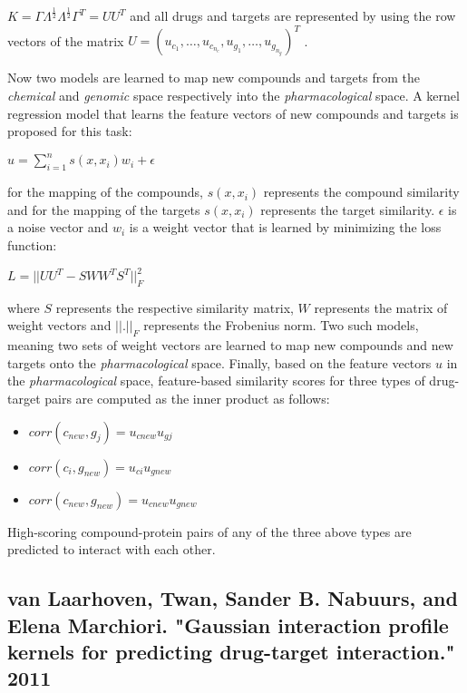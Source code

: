 $K=\Gamma \Lambda^{\frac{1}{2}} \Lambda^{\frac{1}{2}} \Gamma ^T = UU^T$ and all drugs and targets are represented by using the row vectors of the matrix $U=(u_{c_1},\dots,u_{c_{n_c}},u_{g_1},\dots,u_{g_{n_g}})^T$ .

Now two models are learned to map new compounds and targets from the \textit{chemical} and \textit{genomic} space respectively into the \textit{pharmacological} space. A kernel regression model that learns the feature vectors of new compounds and targets is proposed for this task:
\begin{center}
$u=\sum\limits_{i=1}^{n}s(x,x_i)w_i+\epsilon$
\end{center}

for the mapping of the compounds, $s(x,x_i)$ represents the compound similarity and for the mapping of the targets $s(x,x_i)$ represents the target similarity. $\epsilon$ is a noise vector and $w_i$ is a weight vector that is learned by minimizing the loss function:
\begin{center}
$L=||UU^T - SWW^TS^T||^2_F$
\end{center}
where $S$ represents the respective similarity matrix, $W$ represents the matrix of weight vectors and $||.||_F$ represents the Frobenius norm.
Two such models, meaning two sets of weight vectors are learned to map new compounds and new targets onto the \textit{pharmacological} space.
Finally, based on the feature vectors $u$ in the \textit{pharmacological} space, feature-based similarity scores for three types of drug-target pairs are computed as the inner product as follows:
\begin{itemize}
\item $corr(c_{new}, g_j) = u_{cnew}u_{gj}$
\item $corr(c_i, g_{new}) = u_{ci}u_{gnew}$
\item $corr(c_{new},g_{new}) = u_{cnew}u_{gnew}$
\end{itemize}
High-scoring compound-protein pairs of any of the three above types are predicted to interact with each other.

\subsection{van Laarhoven, Twan, Sander B. Nabuurs, and Elena Marchiori. "Gaussian interaction profile kernels for predicting drug-target interaction." 2011}

